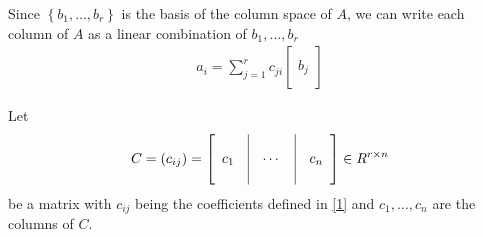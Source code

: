 \documentclass[a4paper,oneside]{book}
\numberwithin{equation}{chapter}
\begin{document}
Since $\left\{ {{b_1}, \ldots ,{b_r}} \right\}$ is the basis of the column space of $A$, we can write each column of $A$ as a linear combination of $b_1,\ldots,b_r$
\begin{align}
{a_i} = \sum\limits_{j = 1}^r {{c_{ji}}\left[ {\begin{array}{*{20}{c}}
{}\\
{{b_j}}\\
{}
\end{array}} \right]} 
\end{align}


Let 
\begin{align}
\label{1}
C = \left( {{c_{ij}}} \right) = \left[ {\begin{array}{*{20}{c}}
{}&\vline& {}&\vline& {}\\
{{c_1}}&\vline&  \cdots &\vline& {{c_n}}\\
{}&\vline& {}&\vline& {}
\end{array}} \right] \in {R^{r \times n}}
\end{align}
be a matrix with $c_{ij}$ being the coefficients defined in \eqref{1} and $c_1,\ldots,c_n$ are the columns of $C$.
\end{document}
